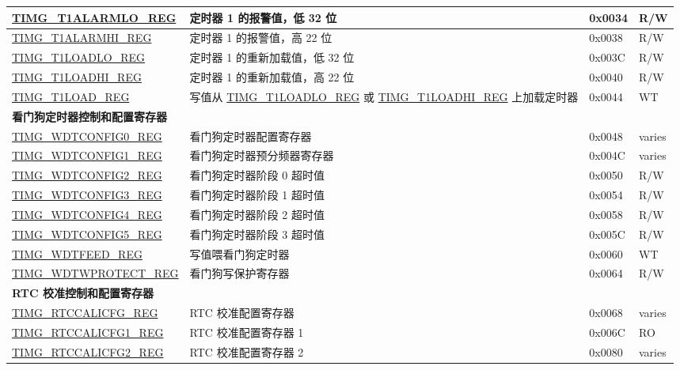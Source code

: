 \begin{longtable}{ | p{6cm} | p{7.2cm} | p{1.3cm} | p{1cm} | }
\hyperref[regdesc:TIMGTXALARMLOREG]{TIMG\_T1ALARMLO\_REG} & 定时器 1 的报警值，低 32 位 & 0x0034 & R/W \\ \hline
\hyperref[regdesc:TIMGTXALARMHIREG]{TIMG\_T1ALARMHI\_REG} & 定时器 1 的报警值，高 22 位 & 0x0038 & R/W \\ \hline
\hyperref[regdesc:TIMGTXLOADLOREG]{TIMG\_T1LOADLO\_REG} & 定时器 1 的重新加载值，低 32 位 & 0x003C & R/W \\ \hline
\hyperref[regdesc:TIMGTXLOADHIREG]{TIMG\_T1LOADHI\_REG} & 定时器 1 的重新加载值，高 22 位 & 0x0040 & R/W \\ \hline
\hyperref[regdesc:TIMGTXLOADREG]{TIMG\_T1LOAD\_REG} & 写值从 \hyperref[regdesc:TIMGTXLOADLOREG]{TIMG\_T1LOADLO\_REG} 或 \hyperref[regdesc:TIMGTXLOADHIREG]{TIMG\_T1LOADHI\_REG} 上加载定时器 & 0x0044 & WT \\ \hline
\multicolumn{4}{|l|}{\textbf{看门狗定时器控制和配置寄存器}} \\ \hline
\hyperref[regdesc:TIMGWDTCONFIG0REG]{TIMG\_WDTCONFIG0\_REG} & 看门狗定时器配置寄存器 & 0x0048 & varies \\ \hline
\hyperref[regdesc:TIMGWDTCONFIG1REG]{TIMG\_WDTCONFIG1\_REG} & 看门狗定时器预分频器寄存器 & 0x004C & varies \\ \hline
\hyperref[regdesc:TIMGWDTCONFIG2REG]{TIMG\_WDTCONFIG2\_REG} & 看门狗定时器阶段 0 超时值 & 0x0050 & R/W \\ \hline
\hyperref[regdesc:TIMGWDTCONFIG3REG]{TIMG\_WDTCONFIG3\_REG} & 看门狗定时器阶段 1 超时值 & 0x0054 & R/W \\ \hline
\hyperref[regdesc:TIMGWDTCONFIG4REG]{TIMG\_WDTCONFIG4\_REG} & 看门狗定时器阶段 2 超时值 & 0x0058 & R/W \\ \hline
\hyperref[regdesc:TIMGWDTCONFIG5REG]{TIMG\_WDTCONFIG5\_REG} & 看门狗定时器阶段 3 超时值 & 0x005C & R/W \\ \hline
\hyperref[regdesc:TIMGWDTFEEDREG]{TIMG\_WDTFEED\_REG} & 写值喂看门狗定时器 & 0x0060 & WT \\ \hline
\hyperref[regdesc:TIMGWDTWPROTECTREG]{TIMG\_WDTWPROTECT\_REG} & 看门狗写保护寄存器 & 0x0064 & R/W \\ \hline
\multicolumn{4}{|l|}{\textbf{RTC 校准控制和配置寄存器}} \\ \hline
\hyperref[regdesc:TIMGRTCCALICFGREG]{TIMG\_RTCCALICFG\_REG} & RTC 校准配置寄存器 & 0x0068 & varies \\ \hline
\hyperref[regdesc:TIMGRTCCALICFG1REG]{TIMG\_RTCCALICFG1\_REG} & RTC 校准配置寄存器 1 & 0x006C & RO \\ \hline
\hyperref[regdesc:TIMGRTCCALICFG2REG]{TIMG\_RTCCALICFG2\_REG} & RTC 校准配置寄存器 2 & 0x0080 & varies \\ \hline

\end{longtable}
